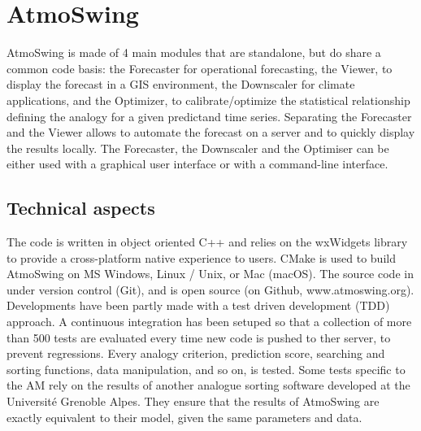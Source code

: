\documentclass[review]{elsarticle}
\begin{document}
\section{AtmoSwing}
\label{sec:atmoswing}

AtmoSwing is made of 4 main modules that are standalone, but do share a common code basis: the Forecaster for operational forecasting, the Viewer, to display the forecast in a GIS environment, the Downscaler for climate applications, and the Optimizer, to calibrate/optimize the statistical relationship defining the analogy for a given predictand time series. Separating the Forecaster and the Viewer allows to automate the forecast on a server and to quickly display the results locally. The Forecaster, the Downscaler and the Optimiser can be either used with a graphical user interface or with a command-line interface.


\subsection{Technical aspects}

The code is written in object oriented C++ and relies on the wxWidgets \citep{Smart2006} library to provide a cross-platform native experience to users. CMake is used to build AtmoSwing on MS Windows, Linux / Unix, or Mac (macOS). The source code in under version control (Git), and is open source (on Github, www.atmoswing.org). Developments have been partly made with a test driven development (TDD) approach. A continuous integration has been setuped so that a collection of more than 500 tests are evaluated every time new code is pushed to ther server, to prevent regressions. Every analogy criterion, prediction score, searching and sorting functions, data manipulation, and so on, is tested. Some tests specific to the AM rely on the results of another analogue sorting software developed at the Universit\'{e} Grenoble Alpes. They ensure that the results of AtmoSwing are exactly equivalent to their model, given the same parameters and data. 
\end{document}
